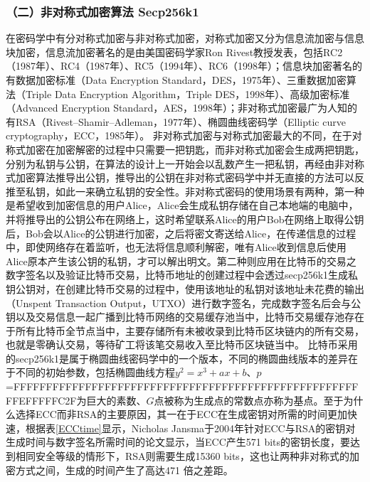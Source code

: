 				\subsubsection{（二）非对称式加密算法 Secp256k1}
				在密码学中有分对称式加密与非对称式加密，对称式加密又分为信息流加密与信息块加密，信息流加密著名的是由美国密码学家Ron Rivest教授发表，包括RC2（1987年）\supercite{OnthedesignandsecurityofRC2}、RC4（1987年）\supercite{Rc4}、RC5（1994年）\supercite{TheRC5encryptionalgorithm}、RC6（1998年）\supercite{TheRC6blockcipher.v1.1August201998}；信息块加密著名的有数据加密标准（Data Encryption Standard，DES，1975年）\supercite{Dataencryptionstandard}、三重数据加密算法（Triple Data Encryption Algorithm，Triple DES，1998年）\supercite{TrippleDataEncryptionAlgorithmModesofOperation}、高级加密标准（Advanced Encryption Standard，AES，1998年）\supercite{ThedesignofRijndael:AES-theadvancedencryptionstandard}；非对称式加密最广为人知的有RSA（Rivest–Shamir–Adleman，1977年）\supercite{Cryptographiccommunicationssystemandmethod}、椭圆曲线密码学（Elliptic curve cryptography，ECC，1985年）\supercite{Ellipticcurvecryptosystems}。
				非对称式加密与对称式加密最大的不同，在于对称式加密在加密解密的过程中只需要一把钥匙，而非对称式加密会生成两把钥匙，分别为私钥与公钥，在算法的设计上一开始会以乱数产生一把私钥，再经由非对称式加密算法推导出公钥，推导出的公钥在非对称式密码学中并无直接的方法可以反推至私钥，如此一来确立私钥的安全性。非对称式密码的使用场景有两种，第一种是希望收到加密信息的用户Alice，Alice会生成私钥存储在自己本地端的电脑中，并将推导出的公钥公布在网络上，这时希望联系Alice的用户Bob在网络上取得公钥后，Bob会以Alice的公钥进行加密，之后将密文寄送给Alice，在传递信息的过程中，即使网络存在着监听，也无法将信息顺利解密，唯有Alice收到信息后使用Alice原本产生该公钥的私钥，才可以解出明文。第二种则应用在比特币的交易之数字签名以及验证比特币交易，比特币地址的创建过程中会透过secp256k1生成私钥公钥对，在创建比特币交易的过程中，使用该地址的私钥对该地址未花费的输出（Unspent Transaction Output，UTXO）\supercite{bitcoinpaper}进行数字签名，完成数字签名后会与公钥以及交易信息一起广播到比特币网络的交易缓存池当中，比特币交易缓存池存在于所有比特币全节点当中，主要存储所有未被收录到比特币区块链内的所有交易，也就是零确认交易，等待矿工将该笔交易收入至比特币区块链当中。
				比特币采用的secp256k1是属于椭圆曲线密码学中的一个版本，不同的椭圆曲线版本的差异在于不同的初始参数，包括椭圆曲线方程$y^2=x^3+ax+b$、$p$=FFFFFFFFFFFFFFFFFFFFFFFFFFFFFFFFFFFFFFFFFFFFFFFFFFFFFFFEFFFFFC2F为巨大的素数、$G$点被称为⽣成点的常数点亦称为基点。至于为什么选择ECC而非RSA的主要原因，其一在于ECC在生成密钥对所需的时间更加快速，根据表\ref{ECCtime}显示，Nicholas Jansma于2004年针对ECC与RSA的密钥对生成时间与数字签名所需时间的论文\supercite{Performancecomparisonofellipticcurveandrsadigitalsignatures}显示，当ECC产生571 bits的密钥长度，要达到相同安全等级的情形下，RSA则需要⽣成15360 bits，这也让两种非对称式的加密方式之间，⽣成的时间产生了⾼达471 倍之差距。

